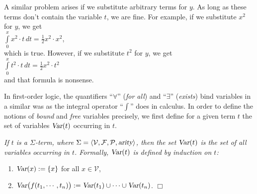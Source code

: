 A similar problem arises if we substitute arbitrary terms for $y$.  
As long as these terms don't contain the variable  $t$, we are fine.
For example, if we substitute $x^2$ for $y$, we get
\\[0.2cm]
\hspace*{1.3cm}  $\int\limits_{0}^{x} x^2 \cdot  t\, d t = \frac{1}{2} x^2 \cdot  x^2$,
 \\[0.2cm]
which is true.  However, if we substitute  $t^2$ for $y$, we get \\[0.2cm]
\hspace*{1.3cm} $\int\limits_{0}^{x} t^2 \cdot  t\, d t = \frac{1}{2} x^2 \cdot  t^2$ \\[0.2cm]
and that formula is nonsense. 
\vspace{0.3cm}


In first-order logic, the quantifiers ``$\forall$'' (\emph{for all}) and ``$\exists$''
(\emph{exists}) bind variables in a similar was as the  integral operator ``$\int$'' does in
calculus.  In order to define the notions of \emph{bound} and \emph{free} variables precisely,
we first define for a given term $t$ the set of variables $\textsl{Var}(t)$ occurring in $t$.


\begin{Definition}[$\var(t)$]
{\em
    If  $t$ is a $\Sigma$-term, where $\Sigma = \langle \mathcal{V}, \mathcal{F}, \mathcal{P}, \textsl{arity} \rangle$,
    then the set $\var(t)$ is the set of all variables occurring in $t$.
    Formally, $\textsl{Var}(t)$ is defined by induction on  $t$:
    \begin{enumerate}
    \item $\textsl{Var}(x) := \{ x \}$ \quad for all $x \in \mathcal{V}$,
    \item $\textsl{Var}\bigl(f(t_1,\cdots,t_n)\bigr) := \textsl{Var}(t_1) \cup \cdots \cup \textsl{Var}(t_n)$.
          \hspace*{\fill} $\Box$
    \end{enumerate}
}
\end{Definition}


